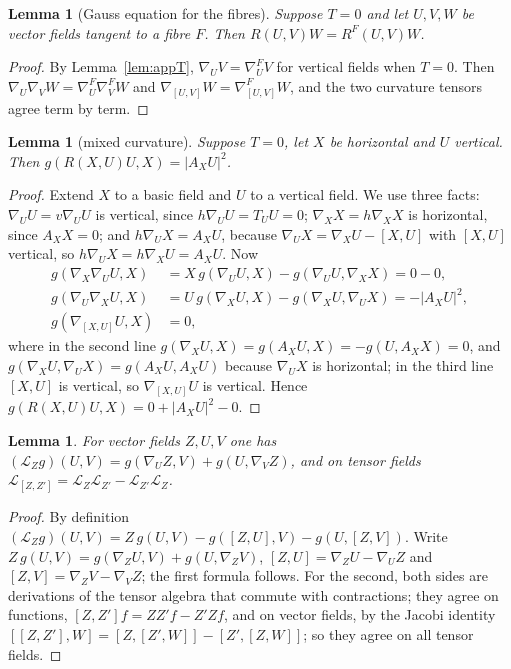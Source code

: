 \documentclass[11pt,reqno]{amsart}
\theoremstyle{plain}
\newtheorem{lemma}[theorem]{Lemma}
\theoremstyle{definition}
\newcommand{\lie}{\mathcal{L}}
\begin{document}
\begin{lemma}[Gauss equation for the fibres]\label{lem:appgauss}
Suppose $T=0$ and let $U,V,W$ be vector fields tangent to a fibre $F$. Then $R(U,V)W=R^F(U,V)W$.
\end{lemma}

\begin{proof}
By Lemma~\ref{lem:appT}, $\nabla_UV=\nabla^F_UV$ for vertical fields when $T=0$. Then $\nabla_U\nabla_VW=\nabla^F_U\nabla^F_VW$ and $\nabla_{[U,V]}W=\nabla^F_{[U,V]}W$, and the two curvature tensors agree term by term.
\end{proof}

\begin{lemma}[mixed curvature]\label{lem:appmixed}
Suppose $T=0$, let $X$ be horizontal and $U$ vertical. Then $g(R(X,U)U,X)=|A_XU|^2$.
\end{lemma}

\begin{proof}
Extend $X$ to a basic field and $U$ to a vertical field. We use three facts: $\nabla_UU=v\nabla_UU$ is vertical, since $h\nabla_UU=T_UU=0$; $\nabla_XX=h\nabla_XX$ is horizontal, since $A_XX=0$; and $h\nabla_UX=A_XU$, because $\nabla_UX=\nabla_XU-[X,U]$ with $[X,U]$ vertical, so $h\nabla_UX=h\nabla_XU=A_XU$. Now
\begin{align*}
g(\nabla_X\nabla_UU,X)&=X\,g(\nabla_UU,X)-g(\nabla_UU,\nabla_XX)=0-0,\\
g(\nabla_U\nabla_XU,X)&=U\,g(\nabla_XU,X)-g(\nabla_XU,\nabla_UX)=-|A_XU|^2,\\
g(\nabla_{[X,U]}U,X)&=0,
\end{align*}
where in the second line $g(\nabla_XU,X)=g(A_XU,X)=-g(U,A_XX)=0$, and $g(\nabla_XU,\nabla_UX)=g(A_XU,A_XU)$ because $\nabla_UX$ is horizontal; in the third line $[X,U]$ is vertical, so $\nabla_{[X,U]}U$ is vertical. Hence $g(R(X,U)U,X)=0+|A_XU|^2-0$.
\end{proof}

\begin{lemma}\label{lem:applie}
For vector fields $Z,U,V$ one has $(\lie_Zg)(U,V)=g(\nabla_UZ,V)+g(U,\nabla_VZ)$, and on tensor fields $\lie_{[Z,Z']}=\lie_Z\lie_{Z'}-\lie_{Z'}\lie_Z$.
\end{lemma}

\begin{proof}
By definition $(\lie_Zg)(U,V)=Z\,g(U,V)-g([Z,U],V)-g(U,[Z,V])$. Write $Z\,g(U,V)=g(\nabla_ZU,V)+g(U,\nabla_ZV)$, $[Z,U]=\nabla_ZU-\nabla_UZ$ and $[Z,V]=\nabla_ZV-\nabla_VZ$; the first formula follows. For the second, both sides are derivations of the tensor algebra that commute with contractions; they agree on functions, $[Z,Z']f=ZZ'f-Z'Zf$, and on vector fields, by the Jacobi identity $[[Z,Z'],W]=[Z,[Z',W]]-[Z',[Z,W]]$; so they agree on all tensor fields.
\end{proof}
\end{document}
